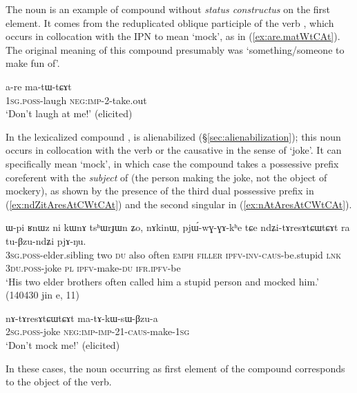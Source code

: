 The noun  is an example of compound without \textit{status constructus} on the first element. It comes from the reduplicated oblique participle of the verb , which occurs in collocation with the IPN  to mean `mock', as in (\ref{ex:are.matWtCAt}). The original meaning of this compound presumably was `something/someone to make fun of'.

\begin{exe}
\ex \label{ex:are.matWtCAt}
\gll a-re ma-tɯ-tɕɤt \\
\textsc{1sg}.\textsc{poss}-laugh \textsc{neg}:\textsc{imp}-2-take.out \\
\glt `Don't laugh at me!' (elicited)
\end{exe}

In the lexicalized compound ,  is alienabilized (§\ref{sec:alienabilization}); this noun occurs in collocation with the verb  or the causative  in the sense of `joke'. It can specifically mean `mock', in which case the compound  takes a possessive prefix coreferent with the \textit{subject} of  (the person making the joke, not the object of mockery), as shown by the presence of the third dual possessive prefix  in (\ref{ex:ndZitAresAtCWtCAt}) and the second singular  in (\ref{ex:nAtAresAtCWtCAt}).

\begin{exe}
\ex \label{ex:ndZitAresAtCWtCAt}
\gll ɯ-pi ʁnɯz ni kɯnɤ tsʰɯrɟɯn ʑo, nɤkinɯ, pjɯ́-wɣ-ɣɤ-kʰe tɕe ndʑi-tɤresɤtɕɯtɕɤt ra tu-βzu-ndʑi pjɤ-ŋu. \\
\textsc{3sg}.\textsc{poss}-elder.sibling two \textsc{du} also often \textsc{emph} \textsc{filler} \textsc{ipfv}-\textsc{inv}-\textsc{caus}-be.stupid \textsc{lnk} \textsc{3du}.\textsc{poss}-joke \textsc{pl} \textsc{ipfv}-make-\textsc{du} \textsc{ifr}.\textsc{ipfv}-be \\
\glt `His two elder brothers often called him a stupid person and mocked him.' (140430 jin e, 11)
\end{exe}

\begin{exe}
\ex \label{ex:nAtAresAtCWtCAt}
\gll nɤ-tɤresɤtɕɯtɕɤt ma-tɤ-kɯ-sɯ-βzu-a  \\
\textsc{2sg}.\textsc{poss}-joke \textsc{neg}:\textsc{imp}-\textsc{imp}-2\fl{}1-\textsc{caus}-make-\textsc{1sg} \\
\glt `Don't mock me!' (elicited)
\end{exe}
In these cases, the noun occurring as first element of the compound corresponds to the object of the verb.
